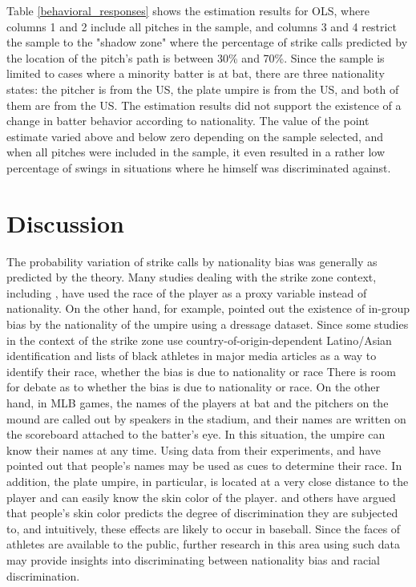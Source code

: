 \documentclass[dvipdfmx, 12pt]{jsarticle}
\begin{document}


Table \ref{behavioral_responses} shows the estimation results for OLS, where columns 1 and 2 include all pitches in the sample, and columns 3 and 4 restrict the sample to the "shadow zone" where the percentage of strike calls predicted by the location of the pitch's path is between 30\% and 70\%. Since the sample is limited to cases where a minority batter is at bat, there are three nationality states: the pitcher is from the US, the plate umpire is from the US, and both of them are from the US. The estimation results did not support the existence of a change in batter behavior according to nationality. The value of the point estimate varied above and below zero depending on the sample selected, and when all pitches were included in the sample, it even resulted in a rather low percentage of swings in situations where he himself was discriminated against.

\section{Discussion}

The probability variation of strike calls by nationality bias was generally as predicted by the theory. Many studies dealing with the strike zone context, including \citet{Parsons_etal_2011}, have used the race of the player as a proxy variable instead of nationality. On the other hand, for example, \citet{Sandberg2018} pointed out the existence of in-group bias by the nationality of the umpire using a dressage dataset. Since some studies in the context of the strike zone use country-of-origin-dependent Latino/Asian identification and lists of black athletes in major media articles as a way to identify their race, whether the bias is due to nationality or race There is room for debate as to whether the bias is due to nationality or race. On the other hand, in MLB games, the names of the players at bat and the pitchers on the mound are called out by speakers in the stadium, and their names are written on the scoreboard attached to the batter's eye. In this situation, the umpire can know their names at any time. Using data from their experiments, \citet{Bertrand_et_al_2004} and \citet{Edelman_et_al_2017} have pointed out that people's names may be used as cues to determine their race. In addition, the plate umpire, in particular, is located at a very close distance to the player and can easily know the skin color of the player. \citet{Monk2015}and others have argued that people's skin color predicts the degree of discrimination they are subjected to, and intuitively, these effects are likely to occur in baseball. Since the faces of athletes are available to the public, further research in this area using such data may provide insights into discriminating between nationality bias and racial discrimination.
\end{document}
